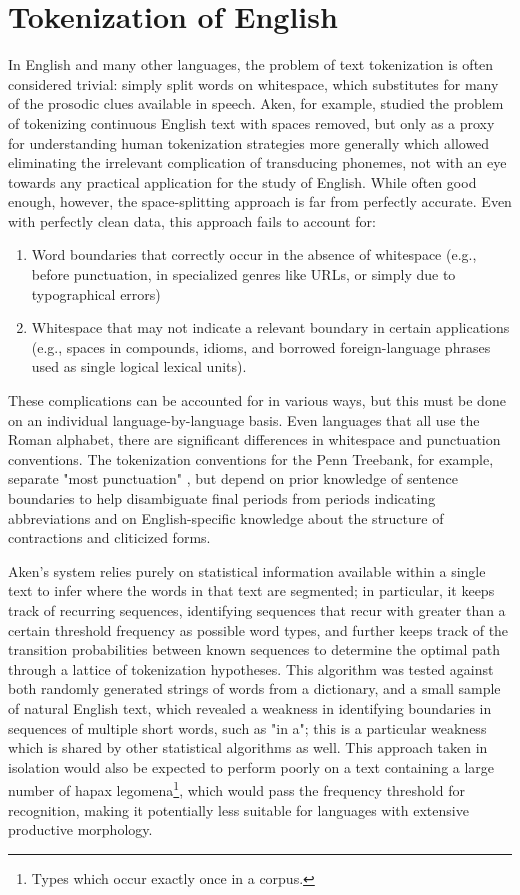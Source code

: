 \section{Tokenization of English}
In English and many other languages, the problem of text tokenization is often considered trivial: simply split words on whitespace, which substitutes for many of the prosodic clues available in speech. Aken\cite{aken11}, for example, studied the problem of tokenizing continuous English text with spaces removed, but only as a proxy for understanding human tokenization strategies more generally which allowed eliminating the irrelevant complication of transducing phonemes, not with an eye towards any practical application for the study of English. While often good enough, however, the space-splitting approach is far from perfectly accurate. Even with perfectly clean data, this approach fails to account for:
\begin{enumerate}
	\item Word boundaries that correctly occur in the absence of whitespace (e.g., before punctuation, in specialized genres like URLs, or simply due to typographical errors)
	\item Whitespace that may not indicate a relevant boundary in certain applications (e.g., spaces in compounds, idioms, and borrowed foreign-language phrases used as single logical lexical units).
\end{enumerate}
These complications can be accounted for in various ways, but this must be done on an individual language-by-language basis. Even languages that all use the Roman alphabet, there are significant differences in whitespace and punctuation conventions. The tokenization conventions for the Penn Treebank, for example, separate "most punctuation" \cite{treebank}, but depend on prior knowledge of sentence boundaries to help disambiguate final periods from periods indicating abbreviations and on English-specific knowledge about the structure of contractions and cliticized forms.

Aken's system relies purely on statistical information available within a single text to infer where the words in that text are segmented; in particular, it keeps track of recurring sequences, identifying sequences that recur with greater than a certain threshold frequency as possible word types, and further keeps track of the transition probabilities between known sequences to determine the optimal path through a lattice of tokenization hypotheses\cite{aken11}. This algorithm was tested against both randomly generated strings of words from a dictionary, and a small sample of natural English text, which revealed a weakness in identifying boundaries in sequences of multiple short words, such as "in a"; this is a particular weakness which is shared by other statistical algorithms as well. This approach taken in isolation would also be expected to perform poorly on a text containing a large number of hapax legomena\footnote{Types which occur exactly once in a corpus.}, which would pass the frequency threshold for recognition, making it potentially less suitable for languages with extensive productive morphology.

